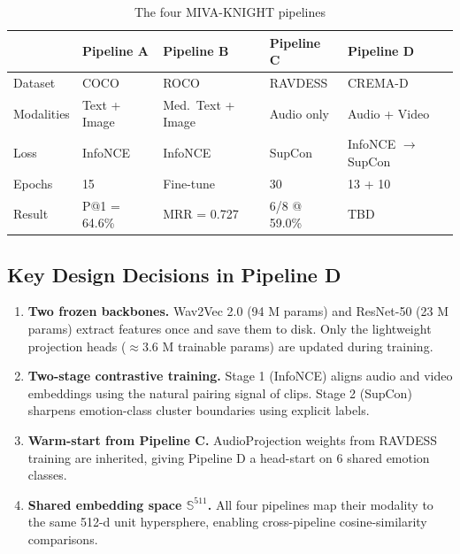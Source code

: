 \documentclass[12pt,a4paper]{article}
\theoremstyle{definition}
\theoremstyle{remark}
\begin{document}
\begin{table}[H]
\centering
\caption{The four MIVA-KNIGHT pipelines}
\begin{tabularx}{\textwidth}{lXXXX}
\toprule
& \textbf{Pipeline A} & \textbf{Pipeline B} & \textbf{Pipeline C} & \textbf{Pipeline D} \\
\midrule
Dataset      & COCO           & ROCO           & RAVDESS         & CREMA-D \\
Modalities   & Text + Image   & Med.\ Text + Image & Audio only  & Audio + Video \\
Loss         & InfoNCE        & InfoNCE        & SupCon          & InfoNCE $\to$ SupCon \\
Epochs       & 15             & Fine-tune      & 30              & 13 + 10 \\
Result       & P@1 = 64.6\%   & MRR = 0.727    & 6/8 @ 59.0\%    & TBD \\
\bottomrule
\end{tabularx}
\end{table}

\subsection{Key Design Decisions in Pipeline D}

\begin{enumerate}
  \item \textbf{Two frozen backbones.} Wav2Vec 2.0 (94 M params) and ResNet-50
        (23 M params) extract features once and save them to disk. Only the
        lightweight projection heads ($\approx$3.6 M trainable params) are
        updated during training.
  \item \textbf{Two-stage contrastive training.} Stage 1 (InfoNCE) aligns audio
        and video embeddings using the natural pairing signal of clips. Stage 2
        (SupCon) sharpens emotion-class cluster boundaries using explicit labels.
  \item \textbf{Warm-start from Pipeline C.} AudioProjection weights from
        RAVDESS training are inherited, giving Pipeline D a head-start on
        6 shared emotion classes.
  \item \textbf{Shared embedding space $\mathbb{S}^{511}$.} All four pipelines
        map their modality to the same 512-d unit hypersphere, enabling
        cross-pipeline cosine-similarity comparisons.
\end{enumerate}

\end{document}
